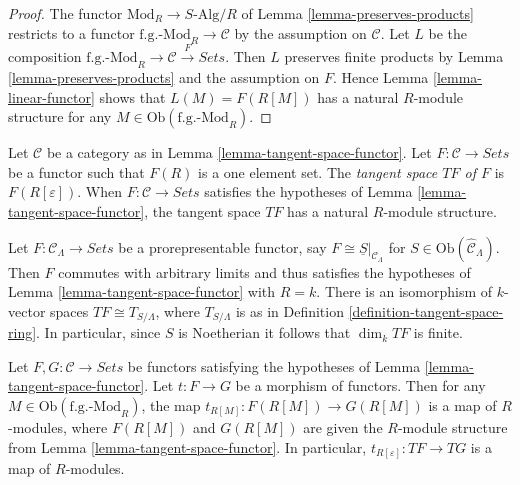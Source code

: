 \begin{proof}
The functor $\text{Mod}_{R} \to S \text{-Alg}/R$ of Lemma 
\ref{lemma-preserves-products} restricts to a functor 
$\text{f.g.-Mod}_{R} \to \mathcal{C}$ by the assumption on 
$\mathcal{C}$. Let $L$ be the composition $\text{f.g.-Mod}_{R} \to 
\mathcal{C} \xrightarrow{F} \textit{Sets}$. Then $L$ preserves finite 
products by Lemma \ref{lemma-preserves-products} and the assumption on $F$.  
Hence Lemma \ref{lemma-linear-functor} shows that $L(M) = F(R[M])$ has a 
natural $R$-module structure for any $M \in 
\text{Ob}(\text{f.g.-Mod}_{R})$.
\end{proof}

\begin{definition}
\label{definition-tangent-space-over-R}
Let $\mathcal{C}$ be a category as in
Lemma \ref{lemma-tangent-space-functor}.  
Let $F: \mathcal{C} \to \textit{Sets}$ be a functor such that 
$F(R)$ is a one element set. The {\it tangent space $TF$ of $F$} is 
$F(R[\varepsilon])$.  When $F: \mathcal{C} \to \textit{Sets}$ 
satisfies the hypotheses of
Lemma \ref{lemma-tangent-space-functor},
the tangent space $TF$ has a natural $R$-module structure.
\end{definition}

\begin{example}
\label{example-tangent-space-prorepresentable-functor}
Let $F: \mathcal{C}_\Lambda \to \textit{Sets}$ be a 
prorepresentable functor, say $F \cong \underline{S}|_{\mathcal{C}_\Lambda}$ 
for $S \in \text{Ob}(\widehat{\mathcal{C}}_\Lambda)$.  Then $F$ commutes 
with arbitrary limits and thus satisfies the hypotheses of Lemma 
\ref{lemma-tangent-space-functor} with $R = k$.  There is an isomorphism of 
$k$-vector spaces $TF \cong T_{S/\Lambda}$, where $T_{S/\Lambda}$ is as in 
Definition \ref{definition-tangent-space-ring}.  In particular, since $S$ is 
Noetherian it follows that $\dim_{k} TF$ is finite.
\end{example}


\begin{lemma}
\label{lemma-morphism-tangent-spaces}
Let $F, G: \mathcal{C} \to \textit{Sets}$ be functors satisfying 
the hypotheses of Lemma \ref{lemma-tangent-space-functor}.  Let $t: F 
\to G$ be a morphism of functors.  Then for any $M \in 
\text{Ob}(\text{f.g.-Mod}_{R})$, the map $t_{R[M]}: F(R[M]) 
\to G(R[M])$ is a map of $R$-modules, where $F(R[M])$ and $G(R[M])$ are 
given the $R$-module structure from Lemma \ref{lemma-tangent-space-functor}.  
In particular, $t_{R[\varepsilon]} : TF \to TG$ is a map of $R$-modules.
\end{lemma}

